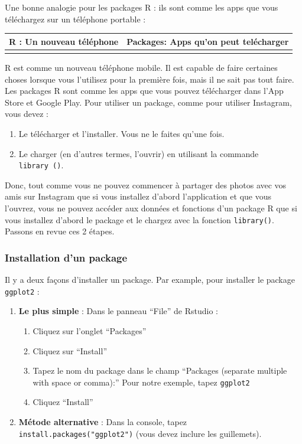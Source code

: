 \documentclass[a4paperpaper,]{article}
\providecommand{\tightlist}{%
  \setlength{\itemsep}{0pt}\setlength{\parskip}{0pt}}
\theoremstyle{definition}
\theoremstyle{definition}
\theoremstyle{definition}
\theoremstyle{remark}
\begin{document}
Une bonne analogie pour les packages R : ils sont comme les apps que
vous téléchargez sur un téléphone portable :

\begin{longtable}[]{@{}cc@{}}
\toprule
R : Un nouveau téléphone & Packages: Apps qu'on peut
telécharger\tabularnewline
\midrule
\endhead
&\tabularnewline
\bottomrule
\end{longtable}

R est comme un nouveau téléphone mobile. Il est capable de faire
certaines choses lorsque vous l'utilisez pour la première fois, mais il
ne sait pas tout faire. Les packages R sont comme les apps que vous
pouvez télécharger dans l'App Store et Google Play. Pour utiliser un
package, comme pour utiliser Instagram, vous devez :

\begin{enumerate}
\def\labelenumi{\arabic{enumi}.}
\tightlist
\item
  Le télécharger et l'installer. Vous ne le faites qu'une fois.
\item
  Le charger (en d'autres termes, l'ouvrir) en utilisant la commande
  \texttt{library\ ()}.
\end{enumerate}

Donc, tout comme vous ne pouvez commencer à partager des photos avec vos
amis sur Instagram que si vous installez d'abord l'application et que
vous l'ouvrez, vous ne pouvez accéder aux données et fonctions d'un
package R que si vous installez d'abord le package et le chargez avec la
fonction \texttt{library()}. Passons en revue ces 2 étapes.

\hypertarget{installation-dun-package}{%
\subsubsection{Installation d'un
package}\label{installation-dun-package}}

Il y a deux façons d'installer un package. Par example, pour installer
le package \texttt{ggplot2} :

\begin{enumerate}
\def\labelenumi{\arabic{enumi}.}
\tightlist
\item
  \textbf{Le plus simple} : Dans le panneau ``File'' de Rstudio :

  \begin{enumerate}
  \def\labelenumii{\alph{enumii})}
  \tightlist
  \item
    Cliquez sur l'onglet ``Packages''
  \item
    Cliquez sur ``Install''
  \item
    Tapez le nom du package dans le champ ``Packages (separate multiple
    with space or comma):'' Pour notre exemple, tapez \texttt{ggplot2}
  \item
    Cliquez ``Install''
  \end{enumerate}
\item
  \textbf{Métode alternative} : Dans la console, tapez
  \texttt{install.packages("ggplot2")} (vous devez inclure les
  guillemets).
\end{enumerate}
\end{document}
